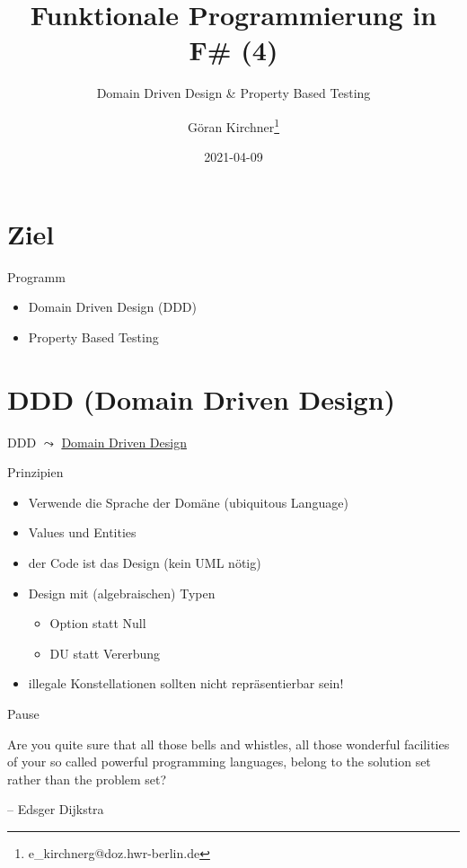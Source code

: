 \documentclass[t]{beamer}
\author{Göran Kirchner\thanks{e\_kirchnerg@doz.hwr-berlin.de}}
\date{2021-04-09}
\title{Funktionale Programmierung in F\# (4)}
\subtitle{Domain Driven Design \& Property Based Testing}
\begin{document}
\maketitle

\section{Ziel }
\label{sec:org5a2c873}
\begin{frame}[label={sec:org81a6070}]{Programm}
\begin{itemize}
\item Domain Driven Design (DDD)
\item Property Based Testing
\end{itemize}
\end{frame}

\section{DDD (Domain Driven Design) }
\label{sec:org8a0a42a}
\begin{frame}[label={sec:orgc4cf564}]{DDD}
\(\leadsto\) \href{./4.1 DDD\_With\_Fsharp.pdf}{Domain Driven Design}
\end{frame}

\begin{frame}[label={sec:org8bbf037}]{Prinzipien}
\begin{itemize}
\item Verwende die Sprache der Domäne (ubiquitous Language)
\item Values und Entities
\item der Code ist das Design (kein UML nötig)
\item Design mit (algebraischen) Typen
\begin{itemize}
\item Option statt Null
\item DU statt Vererbung
\end{itemize}
\item illegale Konstellationen sollten nicht repräsentierbar sein!
\end{itemize}
\end{frame}

\begin{frame}[label={sec:orgc4d4b0c}]{Pause}
\begin{block}{}
Are you quite sure that all those bells and whistles, all those wonderful facilities of your so called powerful programming languages, belong to the solution set rather than the problem set?

\null\hfill -- Edsger Dijkstra
\end{block}
\end{frame}
\end{document}
